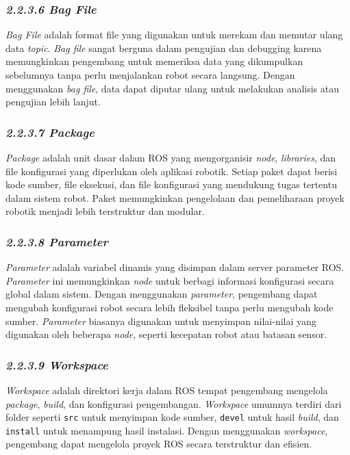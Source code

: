 \subsubsection{\emph{2.2.3.6 Bag File}}
\emph{Bag File} adalah format file yang digunakan untuk merekam dan memutar ulang data \emph{topic}. \emph{Bag file} sangat berguna dalam pengujian dan debugging karena memungkinkan pengembang untuk memeriksa data yang dikumpulkan sebelumnya tanpa perlu menjalankan robot secara langsung. Dengan menggunakan \emph{bag file}, data dapat diputar ulang untuk melakukan analisis atau pengujian lebih lanjut.

\subsubsection{\emph{2.2.3.7 Package}}
\emph{Package} adalah unit dasar dalam ROS yang mengorganisir \emph{node}, \emph{libraries}, dan file konfigurasi yang diperlukan oleh aplikasi robotik. Setiap paket dapat berisi kode sumber, file eksekusi, dan file konfigurasi yang mendukung tugas tertentu dalam sistem robot. Paket memungkinkan pengelolaan dan pemeliharaan proyek robotik menjadi lebih terstruktur dan modular.

\subsubsection{\emph{2.2.3.8 Parameter}}
\emph{Parameter} adalah variabel dinamis yang disimpan dalam server parameter ROS. \emph{Parameter} ini memungkinkan \emph{node} untuk berbagi informasi konfigurasi secara global dalam sistem. Dengan menggunakan \emph{parameter}, pengembang dapat mengubah konfigurasi robot secara lebih fleksibel tanpa perlu mengubah kode sumber. \emph{Parameter} biasanya digunakan untuk menyimpan nilai-nilai yang digunakan oleh beberapa \emph{node}, seperti kecepatan robot atau batasan sensor.

\subsubsection{\emph{2.2.3.9 Workspace}}
\emph{Workspace} adalah direktori kerja dalam ROS tempat pengembang mengelola \emph{package}, \emph{build}, dan konfigurasi pengembangan. \emph{Workspace} umumnya terdiri dari folder seperti \texttt{src} untuk menyimpan kode sumber, \texttt{devel} untuk hasil \emph{build}, dan \texttt{install} untuk menampung hasil instalasi. Dengan menggunakan \emph{workspace}, pengembang dapat mengelola proyek ROS secara terstruktur dan efisien.


